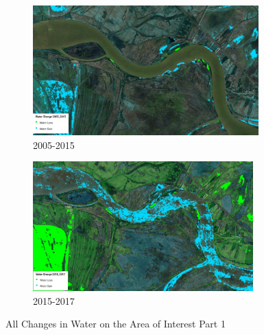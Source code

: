 \begin{figure}[H]
    \begin{subfigure}[b]{0.48\textwidth}
        \includegraphics[width=\linewidth, height =5cm]{figures/appendix-g/2005-2015.jpg}
        \caption{2005-2015}
        \label{fig:second}
    \end{subfigure}
    \hfill
    \begin{subfigure}[b]{0.48\textwidth}
        \includegraphics[width=\linewidth, height =5cm]{figures/ch5/2015-2017.jpg}
        \caption{2015-2017}
        \label{fig:second}
    \end{subfigure}

    \caption{All Changes in Water on the Area of Interest Part 1}
    \label{fig:All Changes in Water on the Area of Interest Part 1}
\end{figure}

